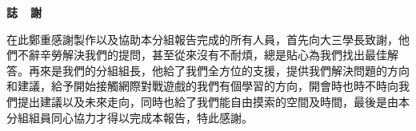 \documentclass[14pt,a4paper]{report}  %
\begin{document}

\newpage
\centerline\LARGE\textbf{誌~~謝}\\
\begin{flushleft}
\fontsize{14pt}{2.5pt}\hspace{12pt}\quad 在此鄭重感謝製作以及協助本分組報告完成的所有人員，首先向大三學長致謝，他們不辭辛勞解決我們的提問，甚至從來沒有不耐煩，總是貼心為我們找出最佳解答。再來是我們的分組組長，他給了我們全方位的支援，提供我們解決問題的方向和建議，給予開始接觸網際對戰遊戲的我們有個學習的方向，開會時也時不時向我們提出建議以及未來走向，同時也給了我們能自由摸索的空間及時間，最後是由本分組組員同心協力才得以完成本報告，特此感謝。
\end{flushleft}
\newpage
\renewcommand{\contentsname}{\centerline{\fontsize{18pt}{\baselineskip}\selectfont\textbf{目\quad 錄}}}
\tableofcontents　　%
\newpage
\renewcommand{\listfigurename}{\centerline{\fontsize{18pt}{\baselineskip}\selectfont\textbf{圖\quad 目\quad 錄 }}}
\newcommand{\loflabel}{圖} %
\renewcommand{\numberline}[1]{\loflabel~#1\hspace*{0.5em}}
\listoffigures
\newpage
\renewcommand{\listtablename}{\centerline{\fontsize{18pt}{\baselineskip}\selectfont\textbf{表\quad 目\quad 錄 }}}
\newcommand{\lotlabel}{表} %
\renewcommand{\numberline}[1]{\lotlabel~#1\hspace*{0.5em}}
\listoftables
\end{document}
